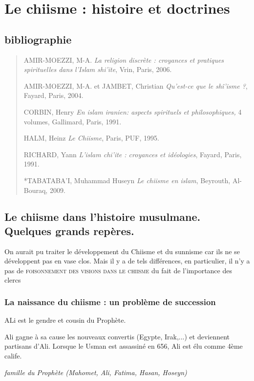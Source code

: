 \chapter{Le chiisme : histoire et doctrines}

\section{bibliographie}
 

\begin{quote}
AMIR-MOEZZI, M-A. \emph{La religion discrète : croyances et pratiques
spirituelles dans l'Islam shi'ite}, Vrin, Paris, 2006.

AMIR-MOEZZI, M-A. et JAMBET, Christian \emph{Qu'est-ce que le shî'isme
?}, Fayard, Paris, 2004.

CORBIN, Henry \emph{En islam iranien: aspects spirituels et
philosophiques,} 4 volumes, Gallimard, Paris, 1991.

HALM, Heinz \emph{Le Chiisme}, Paris, PUF, 1995.

RICHARD, Yann \emph{L'islam chi'ite : croyances et idéologies}, Fayard,
Paris, 1991.

*TABATABA'I, Muhammad Huseyn \emph{Le chiisme en islam}, Beyrouth,
Al-Bouraq, 2009.
\end{quote}


\section{Le chiisme dans l'histoire
  musulmane. Quelques grands
  repères.}
  \label{le-chiisme-dans-lhistoire-musulmane.-quelques-grands-repuxe8res.}

On aurait pu traiter le développement du Chiisme et du sunnisme car ils ne se développent pas en vase clos. Mais il y a de tels différences,  en particulier, il n'y a pas de \textsc{foisonnement des visions dans le chiisme} du fait de l'importance des clercs
  

 \subsection{La naissance du chiisme : un problème de succession}
 ALi est le gendre et cousin du Prophète.
 
 Ali gagne à sa cause les nouveaux convertis (Egypte, Irak,...) et deviennent partisans d'Ali. Lorsque le Usman est assassiné en 656, Ali est élu comme 4ème calife. 
 \begin{Def}
\emph{famille du Prophète (Mahomet, Ali, Fatima, Hasan,
Hoseyn)}
 \end{Def}
 
